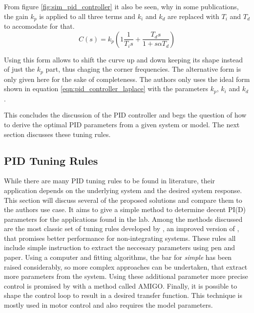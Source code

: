 From figure \ref{fig:sim_pid_controller} it also be seen, why in some publications, the gain $k_p$ is applied to all three terms and $k_i$ and $k_d$ are replaced with $T_i$ and $T_d$ to accomodate for that.
\begin{equation}
    C(s) = k_p \left(1 \frac{1}{T_i s} + \frac{T_d s}{1 + s \alpha T_d} \right) \label{eqn:pid_controller_series}
\end{equation}

Using this form allows to shift the curve up and down keeping its shape instead of just the $k_p$ part, thus chaging the corner frequencies. The alternative form is only given here for the sake of completeness. The authors only uses the ideal form shown in equation \ref{eqn:pid_controller_laplace} with the parameters $k_p$, $k_i$ and $k_d$.

This concludes the discussion of the PID controller and begs the question of how to derive the optimal PID parameters from a given system or model. The next section discusses these tuning rules.

\clearpage
\subsection{PID Tuning Rules}
\label{sec:pid_tuning_rules}
While there are many PID tuning rules to be found in literature, their application depends on the underlying system and the desired system response. This section will discuss several of the proposed solutions and compare them to the authors use case. It aims to give a simple method to determine decent PI(D) parameters for the applications found in the lab. Among the methods discussed are the most classic set of tuning rules developed by \citeauthor{ziegler_nichols} \cite{ziegler_nichols}, an improved version of \citeauthor{simc_paper} \cite{simc_paper}, that promises better performance for non-integrating systems. These rules all include simple instruction to extract the neccesary parameters using pen and paper. Using a computer and fitting algorithms, the bar for \textit{simple} has been raised considerably, so more complex approaches can be undertaken, that extract more parameters from the system. Using these additional parameter more precise control is promised by \citeauthor{pid_basics} \cite{pid_basics, advanced_pid_control} with a method called AMIGO. Finally, it is possible to shape the control loop to result in a desired transfer function. This technique is mostly used in motor control \cite{pid_controller,advanced_pid_control} and also requires the model parameters.

